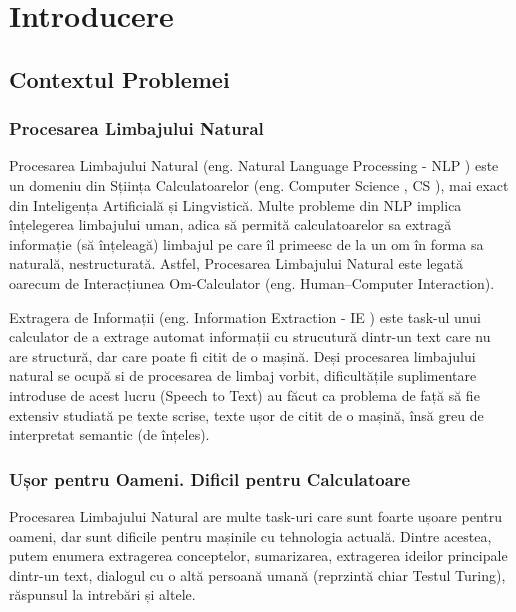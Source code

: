 \chapter{Introducere}
\label{chapter:intro}

\section{Contextul Problemei}

\subsection{Procesarea Limbajului Natural}

Procesarea Limbajului Natural (eng. Natural Language Processing - NLP ) este un domeniu din Sțiința Calculatoarelor (eng. Computer Science , CS ), mai exact din Inteligența Artificială și Lingvistică. Multe probleme din NLP implica înțelegerea limbajului uman, adica să permită calculatoarelor sa extragă informație (să înțeleagă) limbajul pe care îl primeesc de la un om în forma sa naturală, nestructurată. Astfel, Procesarea Limbajului Natural este legată oarecum de Interacțiunea Om-Calculator (eng. Human–Computer Interaction).

Extragera de Informații (eng. Information Extraction - IE ) este task-ul unui calculator de a extrage automat informații cu strucutură dintr-un text care nu are structură, dar care poate fi citit de o mașină. Deși procesarea limbajului natural se ocupă si de procesarea de limbaj vorbit, dificultățile suplimentare introduse de acest lucru (Speech to Text) au făcut ca problema de față să fie extensiv studiată pe texte scrise, texte ușor de citit de o mașină, însă greu de interpretat semantic (de înțeles).


\subsection{Ușor pentru Oameni. Dificil pentru Calculatoare}

Procesarea Limbajului Natural are multe task-uri care sunt foarte ușoare pentru oameni, dar sunt dificile pentru mașinile cu tehnologia actuală. Dintre acestea, putem enumera extragerea conceptelor, sumarizarea, extragerea ideilor principale dintr-un text, dialogul cu o altă persoană umană (reprzintă chiar Testul Turing), răspunsul la intrebări și altele.

